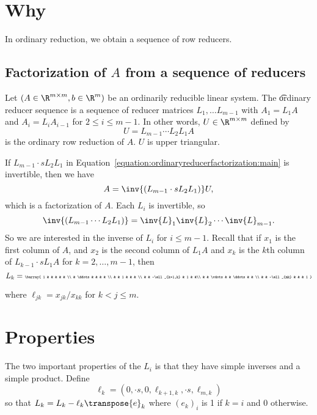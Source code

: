 
\section*{Why}

In ordinary reduction, we obtain a sequence of row reducers.

\subsection*{Factorization of $A$ from a sequence of reducers}

Let $(A \in \R ^{m \times m}, b \in \R ^{m})$ be an ordinarily reducible linear system.
The \t{ordinary reducer sequence} is a sequence of reducer matrices $L_{1}, \dots  L_{m-1}$ with $A_1 = L_1A$ and $A_i = L_iA_{i-1}$ for $2 \leq i \leq m-1$.
In other words, $U \in \R ^{m \times m}$ defined by
\begin{equation}
    \label{equation:ordinaryreducerfactorization:main}U = L_{m-1} \cdots L_2 L_1 A\end{equation}
is the ordinary row reduction of $A$.
$U$ is upper triangular.

If $L_{m-1}\cdot s L_2 L_1$ in Equation~\eqref{equation:ordinaryreducerfactorization:main} is invertible, then we have
\[
A = \inv{(L_{m-1}\cdot s L_2 L_1)}U,
\]
which is a factorization of $A$.
Each $L_i$ is invertible, so
\[
\inv{(L_{m-1} \cdots L_2 L_1)} = \inv{L}_1\inv{L}_2\cdots\inv{L}_{m-1}.
\]
So we are interested in the inverse of $L_i$ for $i \leq m-1$.
Recall that if $x_1$ is the first column of $A$, and $x_2$ is the second column of $L_1A$ and $x_k$ is the $k$th column of $L_{k-1}\cdot s L_{1}A$ for $k = 2, \dots , m-1$, then
\[
{\tiny
L_k = \barray{
1 & & & & & \\
& \ddots & & & & \\
& & 1 & & & \\
& & -\ell _{k+1,k} & 1 & &\\
& & \vdots & & \ddots & & \\
& & -\ell _{mk} & & & 1
}
}
\]

where $\ell _{jk} = x_{jk}/x_{kk}$ for $k < j \leq m$.
\section*{Properties}

The two important properties of the $L_i$ is that they have simple inverses and a simple product.
Define
\[
\ell _k = (0,\cdot s, 0,\ell _{k+1,k}, \cdot s, \ell _{m,k})
\]
so that $L_k = L_k - \ell _k\transpose{e}_k$ where $(e_k)_i$ is 1 if $k = i$ and 0 otherwise.

